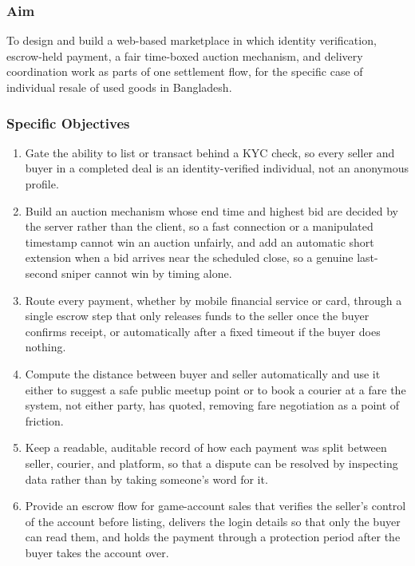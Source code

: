 \documentclass[11pt,a4paper]{article}
\begin{document}
\subsubsection*{Aim}

To design and build a web-based marketplace in which identity verification, escrow-held payment, a
fair time-boxed auction mechanism, and delivery coordination work as parts of one settlement flow,
for the specific case of individual resale of used goods in Bangladesh.

\subsubsection*{Specific Objectives}

\begin{enumerate}
  \item Gate the ability to list or transact behind a KYC check, so every seller and buyer in a
  completed deal is an identity-verified individual, not an anonymous profile.
  \item Build an auction mechanism whose end time and highest bid are decided by the server rather
  than the client, so a fast connection or a manipulated timestamp cannot win an auction unfairly,
  and add an automatic short extension when a bid arrives near the scheduled close, so a genuine
  last-second sniper cannot win by timing alone.
  \item Route every payment, whether by mobile financial service or card, through a single escrow
  step that only releases funds to the seller once the buyer confirms receipt, or automatically after
  a fixed timeout if the buyer does nothing.
  \item Compute the distance between buyer and seller automatically and use it either to suggest a
  safe public meetup point or to book a courier at a fare the system, not either party, has quoted,
  removing fare negotiation as a point of friction.
  \item Keep a readable, auditable record of how each payment was split between seller, courier, and
  platform, so that a dispute can be resolved by inspecting data rather than by taking someone's word
  for it.
  \item Provide an escrow flow for game-account sales that verifies the seller's control of the
  account before listing, delivers the login details so that only the buyer can read them, and holds
  the payment through a protection period after the buyer takes the account over.
\end{enumerate}
\end{document}
